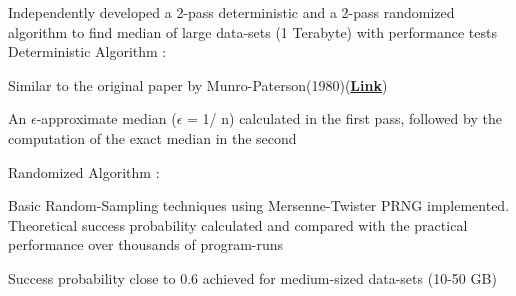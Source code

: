 \documentclass[letterpaper]{Formatting}
\begin{document}
\begin{minipage}[t]{0.66\textwidth}
\vspace{1ex}
Independently developed a 2-pass deterministic and a 2-pass randomized algorithm to find median of large data-sets (1 Terabyte) with performance tests\\\vspace{1ex}
Deterministic Algorithm :\vspace{1ex}
\vspace{\topsep} %
\footnotesize {
\begin{tightitemize}
\item Similar to the original paper by Munro-Paterson(1980)(\textbf{\href{http://polylogblog.files.wordpress.com/2009/08/80munro-median.pdf}{Link}})
\item An $\epsilon$-approximate median ($\epsilon$ = 1/ n) calculated in the first pass, followed by the computation of the exact median in the second
\end{tightitemize}
}
\vspace{2ex}
\small Randomized Algorithm :\vspace{0.5ex}
\vspace{\topsep} %
\footnotesize{
\begin{tightitemize}
\item Basic Random-Sampling techniques using Mersenne-Twister PRNG implemented. Theoretical success probability calculated and compared with the practical performance over thousands of program-runs
\item Success probability close to 0.6 achieved for medium-sized data-sets (10-50 GB)
\end{tightitemize}
}
\sectionspace %
\vspace{2ex}


\end{minipage}
\end{document}
